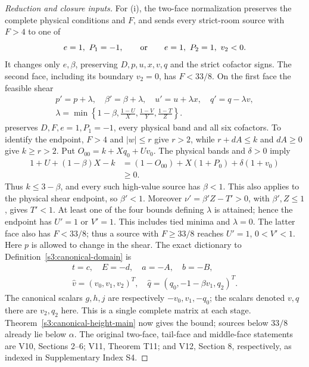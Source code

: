 \documentclass[11pt,reqno]{amsart}
\theoremstyle{definition}
\theoremstyle{remark}
\begin{document}
\begin{proof}[Reduction and closure inputs]
For \textup{(i)}, the two-face normalization preserves the complete
physical conditions and \(F\), and sends every strict-room source
with \(F>4\) to one of
\[
 e=1,\ P_1=-1,
 \qquad\hbox{or}\qquad
 e=1,\ P_2=1,\ v_2<0.
\]
It changes only \(e,\beta\), preserving \(D,p,u,x,v,q\) and
the strict cofactor signs.  The second face, including its boundary
\(v_2=0\), has \(F<33/8\).  On the first face the feasible shear
\[
\begin{gathered}
 p'=p+\lambda,\quad \beta'=\beta+\lambda,\quad
 u'=u+\lambda x,\quad q'=q-\lambda v,\\
 \lambda=\min\left\{1-\beta,\frac{1-U}{X},
                   \frac{1-V}{Y},\frac{1-T}{Z}\right\}.
\end{gathered}
\]
preserves \(D,F,e=1,P_1=-1\), every physical band and all six
cofactors.  To identify the endpoint, \(F>4\) and \(|w|\le r\)
give \(r>2\), while \(r+dA\le k\) and \(dA\ge0\) give
\(k\ge r>2\).  Put \(O_{00}=k+Xq_0+Uv_0\).  The physical
bands and \(\delta>0\) imply
\[
\begin{split}
1+U+(1-\beta)X-k
 &=(1-O_{00})+X(1+P_0)+\delta(1+v_0)\\
 &\ge0.
\end{split}
\]
Thus \(k\le3-\beta\), and every such high-value source has
\(\beta<1\).  This also applies to the physical shear endpoint,
so \(\beta'<1\).  Moreover \(\nu'=\beta'Z-T'>0\), with
\(\beta',Z\le1\), gives \(T'<1\).  At least one of the four
bounds defining \(\lambda\) is attained; hence the endpoint has
\(U'=1\) or \(V'=1\).  This includes tied minima and \(\lambda=0\).
The latter face also has \(F<33/8\); thus a source with
\(F\ge33/8\) reaches \(U'=1\), \(0<V'<1\).
Here \(p\) is allowed to change in the shear.
The exact dictionary to Definition~\ref{s3:canonical-domain} is
\[
\begin{gathered}
 t=c,\quad E=-d,\quad a=-A,\quad b=-B,\\
 \widehat v=(v_0,v_1,v_2)^T,\quad
 \widehat q=(q_0,-1-\beta v_1,q_2)^T.
\end{gathered}
\]
The canonical scalars \(g,h,j\) are respectively
\(-v_0,v_1,-q_0\); the scalars denoted \(v,q\) there are
\(v_2,q_2\) here.  This is a single complete matrix at each stage.
Theorem~\ref{s3:canonical-height-main} now gives the bound; sources
below \(33/8\) already lie below \(\alpha\).
The original two-face, tail-face and middle-face statements are V10,
Sections 2--6; V11, Theorem T11; and V12, Section 8, respectively,
as indexed in Supplementary Index S4.


\end{proof}
\end{document}
